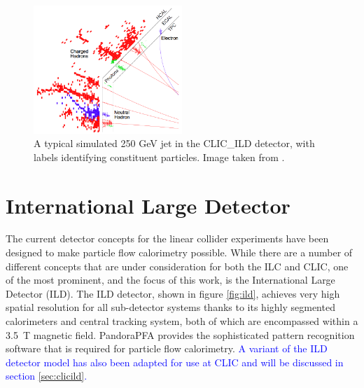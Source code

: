 \begin{figure}[h!]
\centering
\includegraphics[width=0.5\textwidth]{LCDetectorsAndPFlow/Plots/Pictures/PFlow.png}
\caption[A typical simulated 250 GeV jet in the CLIC\_ILD detector, with labels identifying constituent particles.  Image taken from  \cite{arXiv:1209.4039}.]{A typical simulated 250 GeV jet in the CLIC\_ILD detector, with labels identifying constituent particles.  Image taken from  \cite{arXiv:1209.4039}.}
\label{fig:particleflowpic}
\end{figure} 


\section{International Large Detector}
\label{sec:ild}
The current detector concepts for the linear collider experiments have been designed to make particle flow calorimetry possible.  While there are a number of different concepts that are under consideration for both the ILC and CLIC, one of the most prominent, and the focus of this work, is the International Large Detector (ILD).  The ILD detector, shown in figure \ref{fig:ild}, achieves very high spatial resolution for all sub-detector systems thanks to its highly segmented calorimeters and central tracking system, both of which are encompassed within a 3.5~T magnetic field.  PandoraPFA \cite{arXiv:1209.4039, arXiv:0907.3577} provides the sophisticated pattern recognition software that is required for particle flow calorimetry.  \textcolor{blue}{A variant of the ILD detector model has also been adapted for use at CLIC and will be discussed in section \ref{sec:clicild}.}

